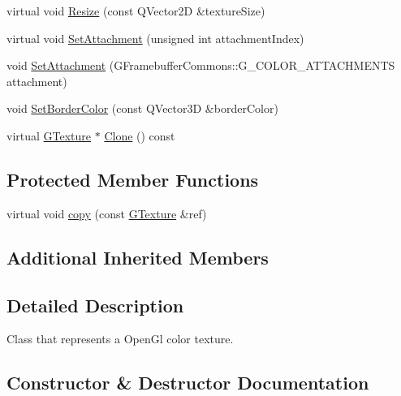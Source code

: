 \begin{DoxyCompactItemize}
\item 
virtual void \mbox{\hyperlink{class_geometry_engine_1_1_geometry_buffer_1_1_g_texture_a17c5c626b214d8d0bfb9988b52376a55}{Resize}} (const Q\+Vector2D \&texture\+Size)
\item 
virtual void \mbox{\hyperlink{class_geometry_engine_1_1_geometry_buffer_1_1_g_texture_a30c0e98fd265c6f47fe7df0ad4f39644}{Set\+Attachment}} (unsigned int attachment\+Index)
\item 
void \mbox{\hyperlink{class_geometry_engine_1_1_geometry_buffer_1_1_g_texture_a1dc99966bc21411656dc776d429b377d}{Set\+Attachment}} (G\+Framebuffer\+Commons\+::\+G\+\_\+\+C\+O\+L\+O\+R\+\_\+\+A\+T\+T\+A\+C\+H\+M\+E\+N\+TS attachment)
\item 
void \mbox{\hyperlink{class_geometry_engine_1_1_geometry_buffer_1_1_g_texture_a458a06591fb47ea1c3246af4c9bae344}{Set\+Border\+Color}} (const Q\+Vector3D \&border\+Color)
\item 
virtual \mbox{\hyperlink{class_geometry_engine_1_1_geometry_buffer_1_1_g_texture}{G\+Texture}} $\ast$ \mbox{\hyperlink{class_geometry_engine_1_1_geometry_buffer_1_1_g_texture_ad8a2b027a88527a03b925448d98efcbf}{Clone}} () const
\end{DoxyCompactItemize}
\subsection*{Protected Member Functions}
\begin{DoxyCompactItemize}
\item 
virtual void \mbox{\hyperlink{class_geometry_engine_1_1_geometry_buffer_1_1_g_texture_aff15a7cb82c8cd1ecf8654e9e62df62e}{copy}} (const \mbox{\hyperlink{class_geometry_engine_1_1_geometry_buffer_1_1_g_texture}{G\+Texture}} \&ref)
\end{DoxyCompactItemize}
\subsection*{Additional Inherited Members}


\subsection{Detailed Description}
Class that represents a Open\+Gl color texture. 

\subsection{Constructor \& Destructor Documentation}
\mbox{\label{class_geometry_engine_1_1_geometry_buffer_1_1_g_texture_a1e4c62fd1d54f676f117ca11a90d55c5}} 
